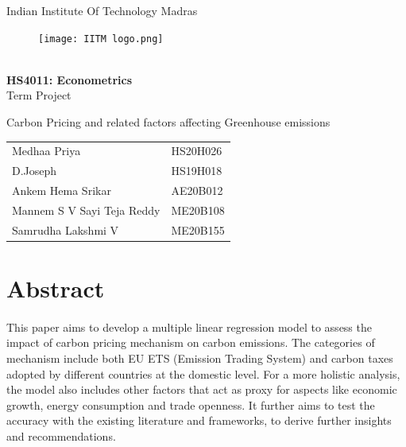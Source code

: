 \documentclass[12pt]{article}
\date{}
\begin{document}
\vspace{2cm}
\begin{center}
\centering
\begin{Huge}
    Indian Institute Of Technology Madras
\end{Huge}
 
    \begin{figure}[htp]
        \centering
        \texttt{[image: IITM logo.png]}
    \end{figure}
\vspace{2cm}
\begin{Large}
     \textbf{\\HS4011: Econometrics\\}
        Term Project\\
\end{Large}
\vspace{1cm}
\begin{Large}
    Carbon Pricing and related factors affecting Greenhouse emissions
\end{Large}
    
\end{center}
\vspace{2cm}
\begin{large}
    \begin{table}[H]
    \centering
    \begin{tabular}{ll}
    Medhaa Priya & HS20H026\\
    D.Joseph & HS19H018\\
    Ankem Hema Srikar & AE20B012\\
    Mannem S V Sayi Teja Reddy & ME20B108 \\
    Samrudha Lakshmi V & ME20B155\\
    \end{tabular}
\end{table}
\end{large}

\newpage
{}

\tableofcontents 
\listoffigures
\newpage

\section{Abstract}
\paragraph{}
This paper aims to develop a multiple linear regression model to assess the impact of carbon pricing mechanism on carbon emissions. The categories of mechanism include both EU ETS (Emission Trading System) and carbon taxes adopted by different countries at the domestic level. For a more holistic analysis, the model also includes other factors that act as proxy for aspects like economic growth, energy consumption and trade openness. It further aims to test the accuracy with the existing literature and frameworks, to derive further insights and recommendations.
\end{document}
